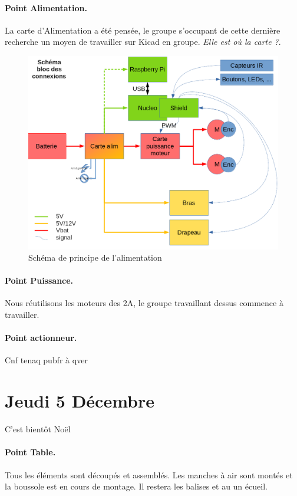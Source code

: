 \documentclass[a4paper,10pt]{report}
\begin{document}
\begin{spacing}{1.5}
\paragraph*{Point Alimentation.}
La carte d'Alimentation a été pensée, le groupe s'occupant de cette dernière
recherche un moyen de travailler sur Kicad en groupe. \textit{Elle est où la
  carte ?}.
\begin{figure}[h!]
  \center
  \includegraphics[scale=0.4]{schema_bloc_connexions.png}
  \caption{Schéma de principe de l'alimentation}
\end{figure}

\paragraph*{Point Puissance.}
Nous réutilisons les moteurs des 2A, le groupe travaillant dessus commence à
travailler.

\paragraph*{Point actionneur.}
Cnf tenaq pubfr à qver

\newpage
\section*{Jeudi 5 Décembre}
C'est bientôt Noël
\paragraph*{Point Table.}
Tous les éléments sont découpés et assemblés. Les manches à air sont montés et
la boussole est en cours de montage. Il restera les balises et au un écueil.


\end{spacing}
\end{document}
